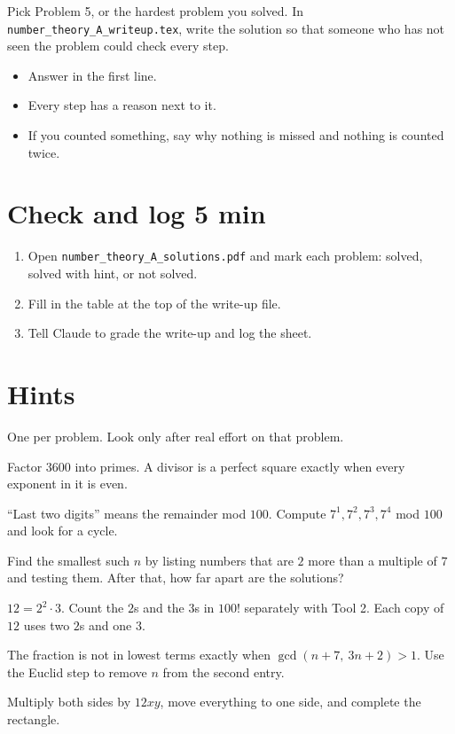 \documentclass[11pt]{article}
\begin{document}
Pick Problem 5, or the hardest problem you solved. In \texttt{number\_theory\_A\_writeup.tex}, write the solution so that someone who has not seen the problem could check every step.
\begin{itemize}
  \item[\checkbox] Answer in the first line.
  \item[\checkbox] Every step has a reason next to it.
  \item[\checkbox] If you counted something, say why nothing is missed and nothing is counted twice.
\end{itemize}

\section{Check and log \hfill 5 min}
\begin{enumerate}
  \item Open \texttt{number\_theory\_A\_solutions.pdf} and mark each problem: solved, solved with hint, or not solved.
  \item Fill in the table at the top of the write-up file.
  \item Tell Claude to grade the write-up and log the sheet.
\end{enumerate}

\clearpage
\section*{Hints}
One per problem. Look only after real effort on that problem.

\begin{hint}[Problem 1]
Factor $3600$ into primes. A divisor is a perfect square exactly when every exponent in it is even.
\end{hint}

\begin{hint}[Problem 2]
``Last two digits'' means the remainder mod $100$. Compute $7^1, 7^2, 7^3, 7^4$ mod $100$ and look for a cycle.
\end{hint}

\begin{hint}[Problem 3]
Find the smallest such $n$ by listing numbers that are $2$ more than a multiple of $7$ and testing them. After that, how far apart are the solutions?
\end{hint}

\begin{hint}[Problem 4]
$12 = 2^2 \cdot 3$. Count the $2$s and the $3$s in $100!$ separately with Tool 2. Each copy of $12$ uses two $2$s and one $3$.
\end{hint}

\begin{hint}[Problem 5]
The fraction is not in lowest terms exactly when $\gcd(n + 7,\ 3n + 2) > 1$. Use the Euclid step to remove $n$ from the second entry.
\end{hint}

\begin{hint}[Problem 6]
Multiply both sides by $12xy$, move everything to one side, and complete the rectangle.
\end{hint}
\end{document}
